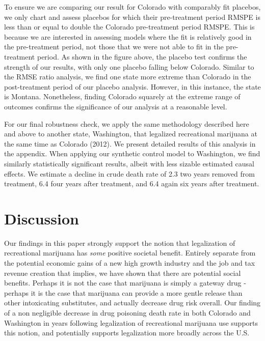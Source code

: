 \documentclass{article}
\begin{document}
To ensure we are comparing our result for Colorado with comparably fit placebos, we only chart and assess placebos for which their pre-treatment period RMSPE is less than or equal to double the Colorado pre-treatment period RMSPE. This is because we are interested in assessing models where the fit is relatively good in the pre-treatment period, not those that we were not able to fit in the pre-treatment period. As shown in the figure above, the placebo test confirms the strength of our results, with only one placebo falling below Colorado. Similar to the RMSE ratio analysis, we find one state more extreme than Colorado in the post-treatment period of our placebo analysis. However, in this instance, the state is Montana. Nonetheless, finding Colorado squarely at the extreme range of outcomes confirms the significance of our analysis at a reasonable level.

For our final robustness check, we apply the same methodology described here and above to another state, Washington, that legalized recreational marijuana at the same time as Colorado (2012). We present detailed results of this analysis in the appendix. When applying our synthetic control model to Washington, we find similarly statistically significant results, albeit with less sizable estimated causal effects. We estimate a decline in crude death rate of 2.3 two years removed from treatment, 6.4 four years after treatment, and 6.4 again six years after treatment. 

\section{Discussion}

Our findings in this paper strongly support the notion that legalization of recreational marijuana has \emph{some} positive societal benefit. Entirely separate from the potential economic gains of a new high growth industry and the job and tax revenue creation that implies, we have shown that there are potential social benefits. Perhaps it is not the case that marijuana is simply a gateway drug - perhaps it is the case that marijuana can provide a more gentle release than other intoxicating substitutes, and actually decrease drug risk overall. Our finding of a non negligible decrease in drug poisoning death rate in both Colorado and Washington in years following legalization of recreational marijuana use supports this notion, and potentially supports legalization more broadly across the U.S.
\end{document}

